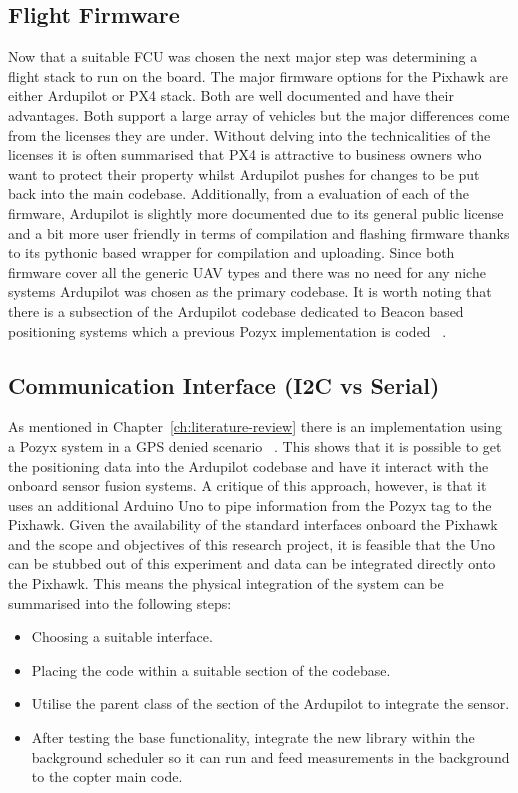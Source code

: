 \subsection{Flight Firmware}\label{subsec:flight-firmware}
Now that a suitable FCU was chosen the next major step was determining a flight stack to run on the board.
The major firmware options for the Pixhawk are either Ardupilot or PX4 stack.
Both are well documented and have their advantages.
Both support a large array of vehicles but the major differences come from the licenses they are under.
Without delving into the technicalities of the licenses it is often summarised that PX4 is attractive to business owners who want to protect their property whilst Ardupilot pushes for changes to be put back into the main codebase.
Additionally, from a evaluation of each of the firmware, Ardupilot is slightly more documented due to its general public license and a bit more user friendly in terms of compilation and flashing firmware thanks to its pythonic based wrapper for compilation and uploading.
Since both firmware cover all the generic UAV types and there was no need for any niche systems Ardupilot was chosen as the primary codebase.
It is worth noting that there is a subsection of the Ardupilot codebase dedicated to Beacon based positioning systems which a previous Pozyx implementation is coded ~\citep{ardupilotarduino}.

\subsection{Communication Interface (I2C vs Serial)}\label{subsec:communication-interfacei2c-vs-serial}
As mentioned in Chapter~\ref{ch:literature-review} there is an implementation using a Pozyx system in a GPS denied scenario ~\cite{ardupilotarduino}.
This shows that it is possible to get the positioning data into the Ardupilot codebase and have it interact with the onboard sensor fusion systems.
A critique of this approach, however, is that it uses an additional Arduino Uno to pipe information from the Pozyx tag to the Pixhawk.
Given the availability of the standard interfaces onboard the Pixhawk and the scope and objectives of this research project, it is feasible that the Uno can be stubbed out of this experiment and data can be integrated directly onto the Pixhawk.
This means the physical integration of the system can be summarised into the following steps:
\begin{itemize}
    \item Choosing a suitable interface.
    \item Placing the code within a suitable section of the codebase.
    \item Utilise the parent class of the section of the Ardupilot to integrate the sensor.
    \item After testing the base functionality, integrate the new library within the background scheduler so it can run and feed measurements in the background to the copter main code.
\end{itemize}

